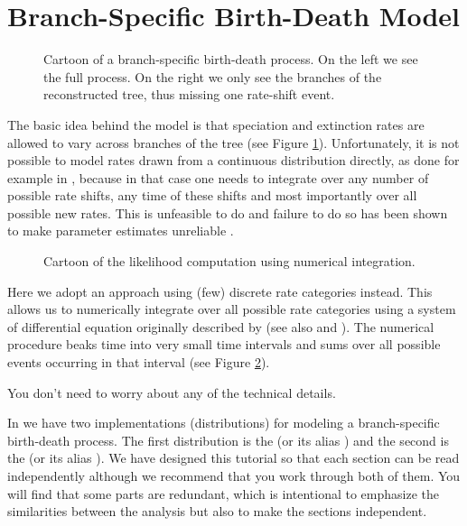 

\bigskip
\section{Branch-Specific Birth-Death Model}

\begin{figure}[htbp!]
\centering
{}
\caption{\small Cartoon of a branch-specific birth-death process. On the left we see the full process. On the right we only see the branches of the reconstructed tree, thus missing one rate-shift event.}
\label{fig:BSBD}
\end{figure}
The basic idea behind the model is that speciation and extinction rates are allowed to vary across branches of the tree (see Figure \ref{fig:BSBD}).
Unfortunately, it is not possible to model rates drawn from a continuous distribution directly, as done for example in \BAMM, because in that case one needs to integrate over any number of possible rate shifts, any time of these shifts and most importantly over all possible new rates.
This is unfeasible to do and failure to do so has been shown to make parameter estimates unreliable \citep{Moore2016}.

\begin{figure}[htbp!]
\centering
{}
\caption{\small Cartoon of the likelihood computation using numerical integration.}
\label{fig:BSBD_likelihood}
\end{figure}
Here we adopt an approach using (few) discrete rate categories instead.
This allows us to numerically integrate over all possible rate categories using a system of differential equation originally described by \cite{Maddison2007} (see also \cite{FitzJohn2009} and \cite{FitzJohn2010}).
The numerical procedure beaks time into very small time intervals and sums over all possible events occurring in that interval (see Figure \ref{fig:BSBD_likelihood}).

You don't need to worry about any of the technical details.

In \RevBayes we have two implementations (\IE distributions) for modeling a branch-specific birth-death process.
The first distribution is the  (or its alias ) and the second is the  (or its alias ).
We have designed this tutorial so that each section can be read independently although we recommend that you work through both of them.
You will find that some parts are redundant, which is intentional to emphasize the similarities between the analysis but also to make the sections independent.


